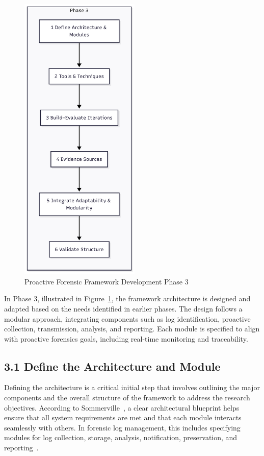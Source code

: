 \begin{figure}[H]
    \centering
    \includegraphics[height=14cm]{figure/framework-development-phase-3.png}
    \caption{Proactive Forensic Framework Development Phase 3}
    \label{fig:framework-development-phase-3}
\end{figure}
In Phase 3, illustrated in Figure~\ref{fig:framework-development-phase-3}, the framework architecture is designed and adapted based on the needs identified in earlier phases. The design follows a modular approach, integrating components such as log identification, proactive collection, transmission, analysis, and reporting. Each module is specified to align with proactive forensics goals, including real-time monitoring and traceability.

\subsection{3.1 Define the Architecture and Module}

Defining the architecture is a critical initial step that involves outlining the major components and the overall structure of the framework to address the research objectives. According to Sommerville~\cite{sommerville2016software}, a clear architectural blueprint helps ensure that all system requirements are met and that each module interacts seamlessly with others. In forensic log management, this includes specifying modules for log collection, storage, analysis, notification, preservation, and reporting~\cite{adel2024ethicore}.

